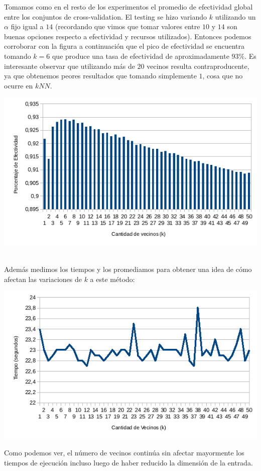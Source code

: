 Tomamos como en el resto de los experimentos el promedio de efectividad global entre los conjuntos de cross-validation. El testing se hizo variando $k$ utilizando un $\alpha$ fijo igual a $14$ (recordando que vimos que tomar valores entre $10$ y $14$ son buenas opciones respecto a efectividad y recursos utilizados). Entonces podemos corroborar con la figura a continuación que el pico de efectividad se encuentra tomando $k = 6$ que produce una tasa de efectividad de aproximadamente $93\%$. Es interesante observar que utilizando más de $20$ vecinos resulta contraproducente, ya que obtenemos peores resultados que tomando simplemente $1$, cosa que no ocurre en $kNN$.
\begin{center}
\includegraphics[scale=0.6]{nuevosResultados/testeokparapcaconalfa=13.png}\\
\end{center}
\\
Además medimos los tiempos y los promediamos para obtener una idea de cómo afectan las variaciones de $k$ a este método:
\begin{center}
\includegraphics[scale=0.6]{nuevosResultados/pca/k/temp.png}\\
\end{center}

Como podemos ver, el número de vecinos continúa sin afectar mayormente los tiempos de ejecución incluso luego de haber reducido la dimensión de la entrada.
